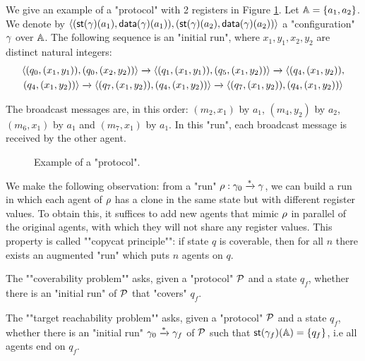 \begin{example}\label{ex:example-1}
	We give an example of a "protocol" with 2 registers in Figure \ref{fig:ex1}. 
	Let $\mathbb{A} = \{a_1, a_2\}$. We denote by $\langle (\mathsf{st}(\gamma)(a_1), \mathsf{data}(\gamma)(a_1)), (\mathsf{st}(\gamma)(a_2),\mathsf{data}(\gamma)(a_2)) \rangle$ a "configuration" $\gamma$ over $\mathbb{A}$. The following sequence is an "initial run", where $x_1,y_1,x_2,y_2$ are distinct natural integers:
	\begin{multline*}
	\langle (q_0, (x_1,y_1)), (q_0,(x_2,y_2)) \rangle \xrightarrow{} \langle (q_1, (x_1,y_1)), (q_5,(x_1,y_2)) \rangle \xrightarrow{} 
	\langle (q_4, (x_1,y_2)),\\ (q_4,(x_1,y_2)) \rangle \xrightarrow{} \langle (q_7, (x_1,y_2)), (q_4,(x_1,y_2)) \rangle \xrightarrow{} \langle (q_7, (x_1,y_2)), (q_4,(x_1,y_2)) \rangle
	\end{multline*}

	The broadcast messages are, in this order: $(m_2,x_1)$ by $a_1$, $(m_4,y_2)$ by $a_2$, $(m_6,x_1)$ by $a_1$ and $(m_7,x_1)$ by $a_1$. In this "run", each broadcast message is received by the other agent. 
\end{example}

\begin{figure}[t]
	
	\vspace{-0.4cm}
	\caption{Example of a "protocol".}\label{fig:ex1}
\end{figure}
	
	


\begin{remark}
	\label{rem:copycat-principle}
	We make the following observation: from a "run" $\rho : \gamma_0 \xrightarrow{\ast} \gamma$, we can build a run in which each agent of $\rho$ has  a clone in the same state but with different register values. To obtain this, it suffices to add new agents that mimic $\rho$ in parallel of the original agents, with which they will not share any register values.  This property is called ""copycat principle"": if state $q$ is coverable, then for all $n$ there exists an augmented "run" which puts $n$ agents on $q$.
\end{remark}

	
\begin{definition}

	\AP The ""coverability problem"" \COVER asks, given a "protocol" $\mathcal{P}$ and a state $q_f$, whether there is an "initial run" of $\mathcal{P}$ that "covers" $q_f$.
	
	\AP The ""target reachability problem"" \TARGET asks, given a "protocol" $\mathcal{P}$ and a state $q_f$, whether there is an "initial run" $\gamma_0 \xrightarrow{*} \gamma_f$ of $\mathcal{P}$ such that $\mathsf{st}(\gamma_f)(\mathbb{A}) = \{q_f\}$, i.e all agents end on $q_f$.
\end{definition}

